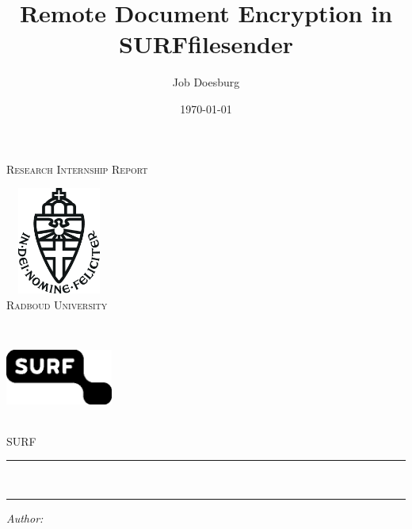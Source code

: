 \documentclass[a4paper]{report}
\author{Job Doesburg}
\title{Remote Document Encryption in SURFfilesender}
\date{\today}
\begin{document}
    \begin{titlepage}
        \parskip=0pt
        \begin{center}
            \textsc{\LARGE Research Internship Report}\\[1.5cm]

            \begin{minipage}[t]{0.45\textwidth}
                \centering
                \includegraphics[width=100pt, height=100pt, keepaspectratio]{imgs/logo-ru}\\[0.4cm]
                \vspace{0.4cm}
                \textsc{\Large Radboud University}\\[1cm]
            \end{minipage}
            \begin{minipage}[t]{0.45\textwidth}
                \centering
                \includegraphics[width=100pt, height=100pt, keepaspectratio]{imgs/logo-surf}\\[0.4cm]
                \vspace{0.4cm}
                \textsc{\Large SURF}\\[1cm]
            \end{minipage}
            \vspace{1.4cm}
            \hrule
            \vspace{0.4cm}
            \textbf{\huge \thetitle}\\[0.4cm]
            \hrule
            \vspace{2cm}
            \begin{minipage}[t]{0.45\textwidth}
                \begin{flushleft} \large
                \textit{Author:}\\
                \theauthor\\

\end{flushleft}
\end{minipage}
\end{center}
\end{titlepage}
\end{document}
